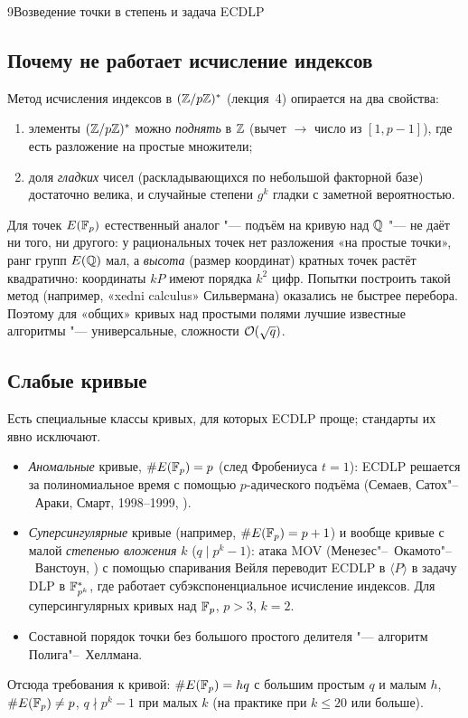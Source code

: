 \begin{lecture}{9}{Возведение точки в степень и задача ECDLP}
\subsection{Почему не работает исчисление индексов}

Метод исчисления индексов в $(\mathbb{Z}/p\mathbb{Z})^{*}$ (лекция~4) опирается на два свойства:
\begin{enumerate}
  \item элементы $(\mathbb{Z}/p\mathbb{Z})^{*}$ можно \emph{поднять} в $\mathbb{Z}$ (вычет $\to$ число из $[1, p - 1]$),
    где есть разложение на простые множители;
  \item доля \emph{гладких} чисел (раскладывающихся по небольшой факторной базе) достаточно
    велика, и случайные степени $g^k$ гладки с заметной вероятностью.
\end{enumerate}
Для точек $E(\mathbb{F}_p)$ естественный аналог "--- подъём на кривую над $\mathbb{Q}$ "--- не даёт ни того,
ни другого: у рациональных точек нет разложения «на простые точки», ранг групп $E(\mathbb{Q})$ мал, а
\emph{высота} (размер координат) кратных точек растёт квадратично: координаты $kP$ имеют
порядка $k^2$ цифр. Попытки построить такой метод (например, «xedni calculus» Сильвермана)
оказались не быстрее перебора. Поэтому для «общих» кривых над простыми полями лучшие известные
алгоритмы "--- универсальные, сложности $\mathcal{O}(\sqrt q)$.

\subsection{Слабые кривые}

Есть специальные классы кривых, для которых ECDLP проще; стандарты их явно исключают.
\begin{itemize}
  \item \emph{Аномальные} кривые, $\#E(\mathbb{F}_p) = p$ (след Фробениуса $t = 1$): ECDLP решается за
    полиномиальное время с помощью $p$-адического подъёма (Семаев, Сатох"--~Араки, Смарт,
    1998--1999, \cite{smart-anomalous}).
  \item \emph{Суперсингулярные} кривые (например, $\#E(\mathbb{F}_p) = p + 1$) и вообще кривые
    с малой \emph{степенью вложения} $k$ ($q \mid p^k - 1$): атака MOV (Менезес"--~Окамото"--~Ванстоун,
    \cite{mov}) с помощью спаривания Вейля переводит ECDLP в $\langle P \rangle$ в задачу DLP
    в $\mathbb{F}_{p^k}^*$, где работает субэкспоненциальное исчисление индексов. Для суперсингулярных
    кривых над $\mathbb{F}_p$, $p > 3$, $k = 2$.
  \item Составной порядок точки без большого простого делителя "--- алгоритм Полига"--~Хеллмана.
\end{itemize}
Отсюда требования к кривой: $\#E(\mathbb{F}_p) = hq$ с большим простым $q$ и малым $h$,
$\#E(\mathbb{F}_p) \ne p$, $q \nmid p^k - 1$ при малых $k$ (на практике при $k \le 20$ или больше).


\end{lecture}
